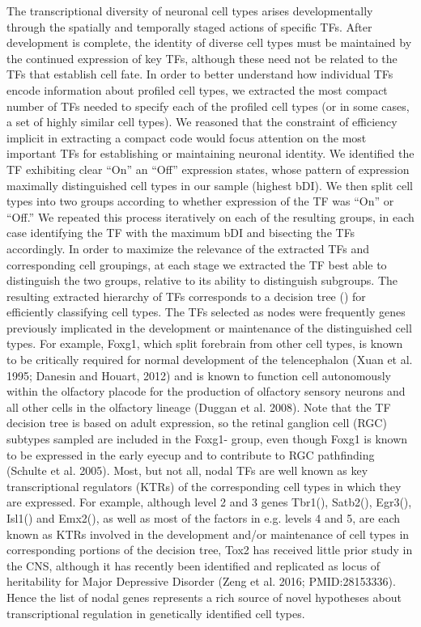 The transcriptional diversity of neuronal cell types arises developmentally through the spatially and temporally staged actions of specific TFs. After development is complete, the identity of diverse cell types must be maintained by the continued expression of key TFs, although these need not be related to the TFs that establish cell fate. In order to better understand how individual TFs encode information about profiled cell types, we extracted the most compact number of TFs needed to specify each of the profiled cell types (or in some cases, a set of highly similar cell types). We reasoned that the constraint of efficiency implicit in extracting a compact code would focus attention on the most important TFs for establishing or maintaining neuronal identity. We identified the TF exhibiting clear “On” an “Off” expression states, whose pattern of expression maximally distinguished cell types in our sample (highest bDI). We then split cell types into two groups according to whether expression of the TF was “On” or “Off.” We repeated this process iteratively on each of the resulting groups, in each case identifying the TF with the maximum bDI and bisecting the TFs accordingly. In order to maximize the relevance of the extracted TFs and corresponding cell groupings, at each stage we extracted the TF best able to distinguish the two groups, relative to its ability to distinguish subgroups. The resulting extracted hierarchy of TFs corresponds to a decision tree () for efficiently classifying cell types. 
The TFs selected as nodes were frequently genes previously implicated in the development or maintenance of the distinguished cell types. For example, Foxg1, which split forebrain from other cell types, is known to be critically required for normal development of the telencephalon (Xuan et al. 1995; Danesin and Houart, 2012) and is known to function cell autonomously within the olfactory placode for the production of olfactory sensory neurons and all other cells in the olfactory lineage (Duggan et al. 2008). Note that the TF decision tree is based on adult expression, so the retinal ganglion cell (RGC) subtypes sampled are included in the Foxg1- group, even though Foxg1 is known to be expressed in the early eyecup and to contribute to RGC pathfinding (Schulte et al. 2005).
Most, but not all, nodal TFs are well known as key transcriptional regulators (KTRs) of the corresponding cell types in which they are expressed. For example, although level 2 and 3 genes Tbr1(), Satb2(), Egr3(), Isl1() and Emx2(), as well as most of the factors in e.g. levels 4 and 5, are each known as KTRs involved in the development and/or maintenance of cell types in corresponding portions of the decision tree, Tox2 has received little prior study in the CNS, although it has recently been identified and replicated as locus of heritability for Major Depressive Disorder (Zeng et al. 2016; PMID:28153336). Hence the list of nodal genes represents a rich source of novel hypotheses about transcriptional regulation in genetically identified cell types. 
